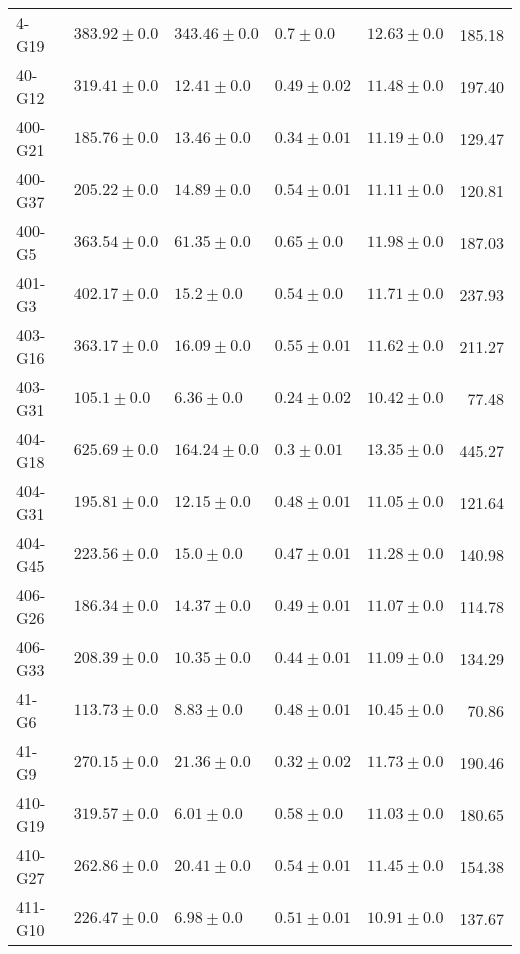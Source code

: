 \begin{tabular}{lllllr}
      4-G19 &     $383.92 \pm 0.0$ &      $343.46 \pm 0.0$ &    $0.7 \pm 0.0$ &  $12.63 \pm 0.0$ &    185.18 \\
     40-G12 &     $319.41 \pm 0.0$ &       $12.41 \pm 0.0$ &  $0.49 \pm 0.02$ &  $11.48 \pm 0.0$ &    197.40 \\
    400-G21 &     $185.76 \pm 0.0$ &       $13.46 \pm 0.0$ &  $0.34 \pm 0.01$ &  $11.19 \pm 0.0$ &    129.47 \\
    400-G37 &     $205.22 \pm 0.0$ &       $14.89 \pm 0.0$ &  $0.54 \pm 0.01$ &  $11.11 \pm 0.0$ &    120.81 \\
     400-G5 &     $363.54 \pm 0.0$ &       $61.35 \pm 0.0$ &   $0.65 \pm 0.0$ &  $11.98 \pm 0.0$ &    187.03 \\
     401-G3 &     $402.17 \pm 0.0$ &        $15.2 \pm 0.0$ &   $0.54 \pm 0.0$ &  $11.71 \pm 0.0$ &    237.93 \\
    403-G16 &     $363.17 \pm 0.0$ &       $16.09 \pm 0.0$ &  $0.55 \pm 0.01$ &  $11.62 \pm 0.0$ &    211.27 \\
    403-G31 &      $105.1 \pm 0.0$ &        $6.36 \pm 0.0$ &  $0.24 \pm 0.02$ &  $10.42 \pm 0.0$ &     77.48 \\
    404-G18 &     $625.69 \pm 0.0$ &      $164.24 \pm 0.0$ &   $0.3 \pm 0.01$ &  $13.35 \pm 0.0$ &    445.27 \\
    404-G31 &     $195.81 \pm 0.0$ &       $12.15 \pm 0.0$ &  $0.48 \pm 0.01$ &  $11.05 \pm 0.0$ &    121.64 \\
    404-G45 &     $223.56 \pm 0.0$ &        $15.0 \pm 0.0$ &  $0.47 \pm 0.01$ &  $11.28 \pm 0.0$ &    140.98 \\
    406-G26 &     $186.34 \pm 0.0$ &       $14.37 \pm 0.0$ &  $0.49 \pm 0.01$ &  $11.07 \pm 0.0$ &    114.78 \\
    406-G33 &     $208.39 \pm 0.0$ &       $10.35 \pm 0.0$ &  $0.44 \pm 0.01$ &  $11.09 \pm 0.0$ &    134.29 \\
      41-G6 &     $113.73 \pm 0.0$ &        $8.83 \pm 0.0$ &  $0.48 \pm 0.01$ &  $10.45 \pm 0.0$ &     70.86 \\
      41-G9 &     $270.15 \pm 0.0$ &       $21.36 \pm 0.0$ &  $0.32 \pm 0.02$ &  $11.73 \pm 0.0$ &    190.46 \\
    410-G19 &     $319.57 \pm 0.0$ &        $6.01 \pm 0.0$ &   $0.58 \pm 0.0$ &  $11.03 \pm 0.0$ &    180.65 \\
    410-G27 &     $262.86 \pm 0.0$ &       $20.41 \pm 0.0$ &  $0.54 \pm 0.01$ &  $11.45 \pm 0.0$ &    154.38 \\
    411-G10 &     $226.47 \pm 0.0$ &        $6.98 \pm 0.0$ &  $0.51 \pm 0.01$ &  $10.91 \pm 0.0$ &    137.67 \\

\end{tabular}
